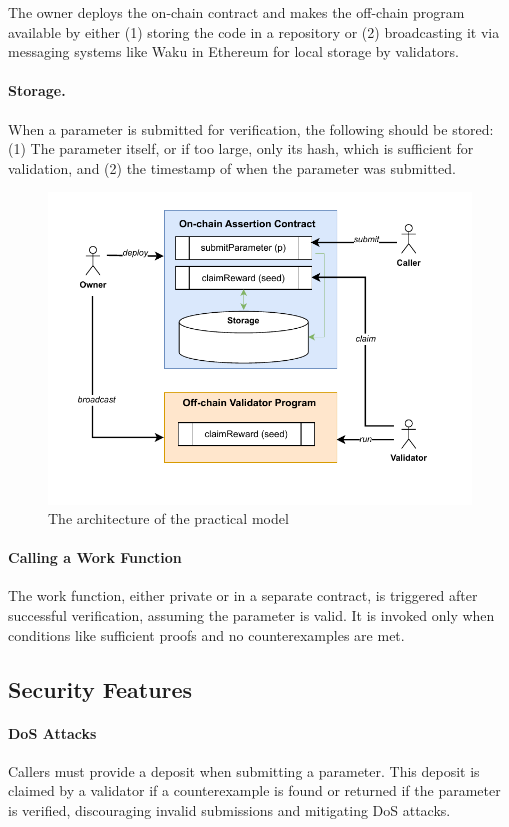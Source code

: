 \documentclass[runningheads]{llncs}
\begin{document}
The owner deploys the on-chain contract and makes the off-chain program available by either (1) storing the code in a repository or (2) broadcasting it via messaging systems like Waku in Ethereum for local storage by validators.
\paragraph{Storage.}
When a parameter is submitted for verification, the following should be stored: (1) The parameter itself, or if too large, only its hash, which is sufficient for validation, and (2) the timestamp of when the parameter was submitted.
\begin{figure}
\centering
\includegraphics[scale=.6]{assertion1}
\caption{The architecture of the practical model}
\label{fig.architect}
\end{figure}
\paragraph{Calling a Work Function}
The work function, either private or in a separate contract, is triggered after successful verification, assuming the parameter is valid. It is invoked only when conditions like sufficient proofs and no counterexamples are met.
\subsection{Security Features}
\paragraph{DoS Attacks}
Callers must provide a deposit when submitting a parameter. This deposit is claimed by a validator if a counterexample is found or returned if the parameter is verified, discouraging invalid submissions and mitigating DoS attacks.
\end{document}

